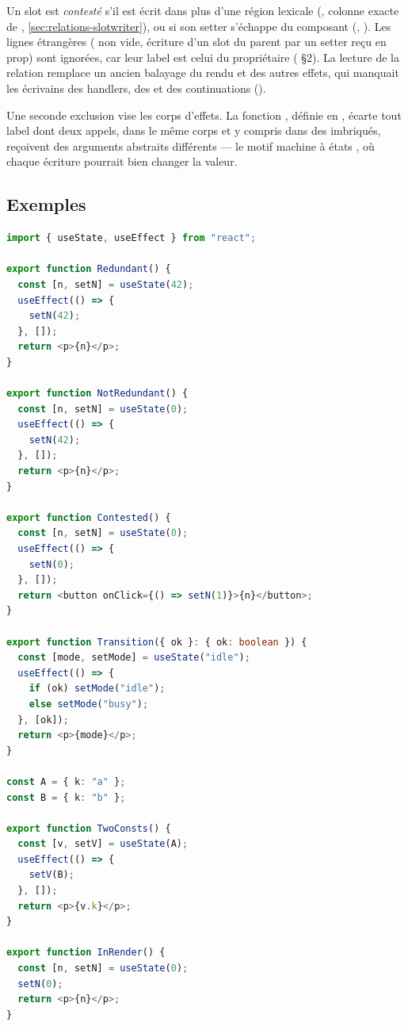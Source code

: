 
Un slot est \emph{contesté} s'il est écrit dans plus d'une région lexicale (, colonne exacte de , \cref{sec:relations-slotwriter}), ou si son setter s'échappe du composant (, ). Les lignes étrangères ( non vide, écriture d'un slot du parent par un setter reçu en prop) sont ignorées, car leur label est celui du propriétaire ( §2). La lecture de la relation remplace un ancien balayage du rendu et des autres effets, qui manquait les écrivains des handlers, des  et des continuations  ().

Une seconde exclusion vise les corps d'effets. La fonction , définie en , écarte tout label dont deux appels, dans le même corps et y compris dans des  imbriqués, reçoivent des arguments abstraits différents --- le motif \og machine à états\fg{} , où chaque écriture pourrait bien changer la valeur.

\subsection{Exemples}

\begin{lstlisting}[language=TypeScript,caption={Écritures redondantes ou non (\file{/tmp/ch18/redundant.tsx})},label={lst:regles-etat-redundant-ex}]
import { useState, useEffect } from "react";

export function Redundant() {
  const [n, setN] = useState(42);
  useEffect(() => {
    setN(42);
  }, []);
  return <p>{n}</p>;
}

export function NotRedundant() {
  const [n, setN] = useState(0);
  useEffect(() => {
    setN(42);
  }, []);
  return <p>{n}</p>;
}

export function Contested() {
  const [n, setN] = useState(0);
  useEffect(() => {
    setN(0);
  }, []);
  return <button onClick={() => setN(1)}>{n}</button>;
}

export function Transition({ ok }: { ok: boolean }) {
  const [mode, setMode] = useState("idle");
  useEffect(() => {
    if (ok) setMode("idle");
    else setMode("busy");
  }, [ok]);
  return <p>{mode}</p>;
}

const A = { k: "a" };
const B = { k: "b" };

export function TwoConsts() {
  const [v, setV] = useState(A);
  useEffect(() => {
    setV(B);
  }, []);
  return <p>{v.k}</p>;
}

export function InRender() {
  const [n, setN] = useState(0);
  setN(0);
  return <p>{n}</p>;
}
\end{lstlisting}

